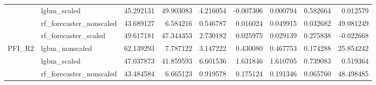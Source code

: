 \begin{table}
\begin{tabular}{llrrrrrrr}
 & lgbm\_scaled & {\cellcolor[HTML]{D44E41}} \color[HTML]{F1F1F1} 45.292131 & {\cellcolor[HTML]{B40426}} \color[HTML]{F1F1F1} 49.903083 & {\cellcolor[HTML]{5470DE}} \color[HTML]{F1F1F1} 4.216054 & {\cellcolor[HTML]{3B4CC0}} \color[HTML]{F1F1F1} -0.007306 & {\cellcolor[HTML]{3B4CC0}} \color[HTML]{F1F1F1} 0.000794 & {\cellcolor[HTML]{3E51C5}} \color[HTML]{F1F1F1} 0.582664 & {\cellcolor[HTML]{3B4CC0}} \color[HTML]{F1F1F1} 0.012579 \\
 & rf\_forecaster\_nonscaled & {\cellcolor[HTML]{D95847}} \color[HTML]{F1F1F1} 43.689127 & {\cellcolor[HTML]{6485EC}} \color[HTML]{F1F1F1} 6.584216 & {\cellcolor[HTML]{3D50C3}} \color[HTML]{F1F1F1} 0.546787 & {\cellcolor[HTML]{3B4CC0}} \color[HTML]{F1F1F1} 0.016024 & {\cellcolor[HTML]{3B4CC0}} \color[HTML]{F1F1F1} 0.049915 & {\cellcolor[HTML]{3B4CC0}} \color[HTML]{F1F1F1} 0.032682 & {\cellcolor[HTML]{B40426}} \color[HTML]{F1F1F1} 49.081249 \\
 & rf\_forecaster\_scaled & {\cellcolor[HTML]{B40426}} \color[HTML]{F1F1F1} 49.617181 & {\cellcolor[HTML]{C43032}} \color[HTML]{F1F1F1} 47.344353 & {\cellcolor[HTML]{4B64D5}} \color[HTML]{F1F1F1} 2.730182 & {\cellcolor[HTML]{3B4CC0}} \color[HTML]{F1F1F1} 0.025975 & {\cellcolor[HTML]{3B4CC0}} \color[HTML]{F1F1F1} 0.029139 & {\cellcolor[HTML]{3C4EC2}} \color[HTML]{F1F1F1} 0.275838 & {\cellcolor[HTML]{3B4CC0}} \color[HTML]{F1F1F1} -0.022668 \\
\cline{1-9}
\multirow[c]{4}{*}{PFI\_R2} & lgbm\_nonscaled & {\cellcolor[HTML]{B40426}} \color[HTML]{F1F1F1} 62.139293 & {\cellcolor[HTML]{6180E9}} \color[HTML]{F1F1F1} 7.787122 & {\cellcolor[HTML]{4961D2}} \color[HTML]{F1F1F1} 3.147222 & {\cellcolor[HTML]{3C4EC2}} \color[HTML]{F1F1F1} 0.430080 & {\cellcolor[HTML]{3C4EC2}} \color[HTML]{F1F1F1} 0.467753 & {\cellcolor[HTML]{3B4CC0}} \color[HTML]{F1F1F1} 0.174288 & {\cellcolor[HTML]{C5D6F2}} \color[HTML]{000000} 25.854242 \\
 & lgbm\_scaled & {\cellcolor[HTML]{B40426}} \color[HTML]{F1F1F1} 47.037873 & {\cellcolor[HTML]{D95847}} \color[HTML]{F1F1F1} 41.859593 & {\cellcolor[HTML]{6384EB}} \color[HTML]{F1F1F1} 6.601536 & {\cellcolor[HTML]{4257C9}} \color[HTML]{F1F1F1} 1.631846 & {\cellcolor[HTML]{4257C9}} \color[HTML]{F1F1F1} 1.610705 & {\cellcolor[HTML]{3C4EC2}} \color[HTML]{F1F1F1} 0.739083 & {\cellcolor[HTML]{3B4CC0}} \color[HTML]{F1F1F1} 0.519364 \\
 & rf\_forecaster\_nonscaled & {\cellcolor[HTML]{D75445}} \color[HTML]{F1F1F1} 43.484584 & {\cellcolor[HTML]{6485EC}} \color[HTML]{F1F1F1} 6.665123 & {\cellcolor[HTML]{3F53C6}} \color[HTML]{F1F1F1} 0.919578 & {\cellcolor[HTML]{3B4CC0}} \color[HTML]{F1F1F1} 0.175124 & {\cellcolor[HTML]{3B4CC0}} \color[HTML]{F1F1F1} 0.191346 & {\cellcolor[HTML]{3B4CC0}} \color[HTML]{F1F1F1} 0.065760 & {\cellcolor[HTML]{B40426}} \color[HTML]{F1F1F1} 48.498485 \\

\end{tabular}
\end{table}

